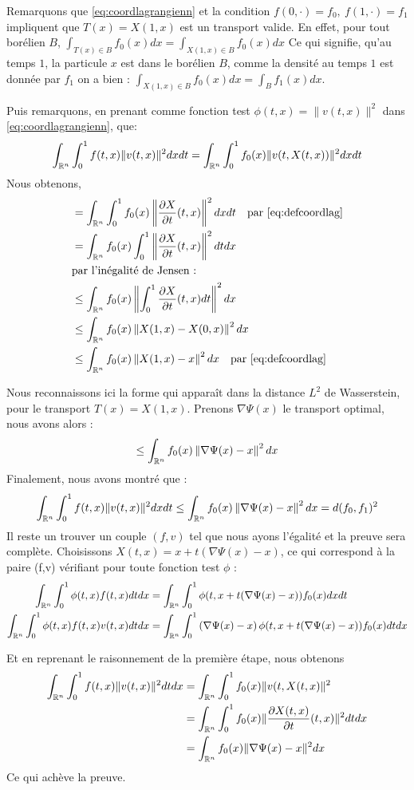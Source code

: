 \documentclass[a4paper,12pt]{article}
\begin{document}
\begin{preuve}
Remarquons que \eqref{eq:coordlagrangienn} et la condition $f(0,\cdot)=f_0,\ f(1,\cdot) = f_1$ impliquent que $T(x)=X(1,x)$ est un transport valide. En effet, pour tout borélien $B$, $\int_{T(x)\in B}f_0(x) dx = \int_{X(1,x)\in B}f_0(x) dx$ Ce qui signifie, qu'au temps $1$, la particule $x$ est dans le borélien $B$, comme la densité au temps $1$ est donnée par $f_1$ on a bien : $\int_{X(1,x)\in B}f_0(x) dx = \int_B f_1(x)dx$.


Puis remarquons, en prenant comme fonction test $\phi(t,x) = \|v(t,x)\|^2$ dans \eqref{eq:coordlagrangienn}, que: 
$$
\int_{\mathbb{R}^n}\int_0^1 f(t,x)\|v(t,x)\|^2dxdt = \int_{\mathbb{R}^n}\int_0^1 f_0(x)\|v(t,X(t,x))\|^2dxdt
$$
Nous obtenons, 
\begin{align*}
&= \int_{\mathbb{R}^n}\int_0^1  f_0(x)\left\|\frac{\partial X}{\partial t} (t,x)\right\|^2dxdt \quad \text{par } \eqref{eq:defcoordlag}\\
&= \int_{\mathbb{R}^n} f_0(x)\int_0^1 \left\|\frac{\partial X}{\partial t} (t,x)\right\|^2dtdx\\
&\text{par l'inégalité de Jensen : }\\
&\leq \int_{\mathbb{R}^n} f_0(x)\left\|\int_0^1\frac{\partial X}{\partial t} (t,x) dt \right\|^2dx \\
&\leq \int_{\mathbb{R}^n} f_0(x)\left\| X(1,x)-X(0,x) \right\|^2dx \\
&\leq \int_{\mathbb{R}^n} f_0(x)\left\| X(1,x)-x \right\|^2dx  \quad \text{par } \eqref{eq:defcoordlag}\\
\end{align*}

Nous reconnaissons ici la forme qui apparaît dans la distance $L^2$ de Wasserstein, pour le transport $T(x) = X(1,x)$. Prenons $\nabla\Psi(x)$ le transport optimal, nous avons alors :  
$$
\leq \int_{\mathbb{R}^n} f_0(x)\left\| \nabla\Psi(x)-x \right\|^2dx
$$
Finalement, nous avons montré que : 
$$
\int_{\mathbb{R}^n}\int_0^1 f(t,x)\|v(t,x)\|^2dxdt \leq \int_{\mathbb{R}^n} f_0(x)\left\| \nabla\Psi(x)-x \right\|^2dx = d(f_0,f_1)^2
$$
Il reste un trouver un couple $(f,v)$ tel que nous ayons l'égalité et la preuve sera complète. Choisissons $X(t,x) = x+t(\nabla\Psi(x)-x)$, ce qui correspond à la paire (f,v) vérifiant pour toute fonction test $\phi$ : 
\begin{align*}
\int_{\mathbb{R}^n} \int_0^1 \phi(t,x)f(t,x)dtdx &=\int_{\mathbb{R}^n} \int_0^1 \phi(t, x+t(\nabla\Psi(x)-x)) f_0(x)dxdt \\
\int_{\mathbb{R}^n} \int_0^1 \phi (t,x)f(t,x)v(t,x) dtdx &= \int_{\mathbb{R}^n} \int_0^1 \left(\nabla\Psi (x) - x\right) \phi(t, x+t(\nabla\Psi(x)-x)) f_0(x)  dtdx
\end{align*}


Et en reprenant le raisonnement de la première étape, nous obtenons
\begin{align*}
\int_{\mathbb{R}^n} \int_0^1 f(t,x)\|v(t,x)\|^2dtdx &= \int_{\mathbb{R}^n} \int_0^1 f_0(x)\|v(t,X(t,x)\|^2\\
&= \int_{\mathbb{R}^n} \int_0^1 f_0(x) \|\frac{\partial X(t,x)}{\partial t}(t,x)\|^2 dtdx \\
&= \int_{\mathbb{R}^n} f_0(x) \|\nabla \Psi(x) -x\|^2dx \\
\end{align*}
Ce qui achève la preuve. 
\end{preuve}
\end{document}
